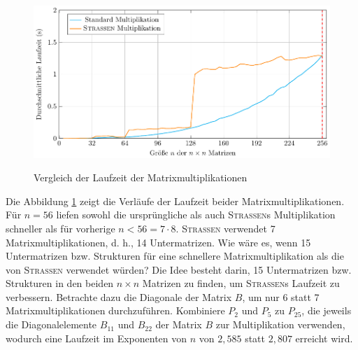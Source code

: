 \documentclass{scrartcl}
\begin{document}
\begin{figure}[h]
	\centering
	\caption{Vergleich der Laufzeit der Matrixmultiplikationen}
	\includegraphics[width=1.0\textwidth]{results.pdf}
	\label{fig:time-comparison}
\end{figure}

Die Abbildung \ref{fig:time-comparison} zeigt die Verläufe der Laufzeit beider Matrixmultiplikationen. Für $n = 56$ liefen sowohl die ursprüngliche als auch \textsc{Strassen}s Multiplikation schneller als für vorherige $n < 56 = 7 \cdot 8$. \textsc{Strassen} verwendet 7 Matrixmultiplikationen, d. h., 14 Untermatrizen. Wie wäre es, wenn 15 Untermatrizen bzw. Strukturen für eine schnellere Matrixmultiplikation als die von \textsc{Strassen} verwendet würden? Die Idee besteht darin, 15 Untermatrizen bzw. Strukturen in den beiden $n \times n$ Matrizen zu finden, um \textsc{Strassen}s Laufzeit zu verbessern. Betrachte dazu die Diagonale der Matrix $B$, um nur 6 statt 7 Matrixmultiplikationen durchzuführen. Kombiniere $P_2$ und $P_5$ zu $P_{25}$, die jeweils die Diagonalelemente $B_{11}$ und $B_{22}$ der Matrix $B$ zur Multiplikation verwenden, wodurch eine Laufzeit im Exponenten von $n$ von $2,585$ statt $2,807$ erreicht wird.
\end{document}
